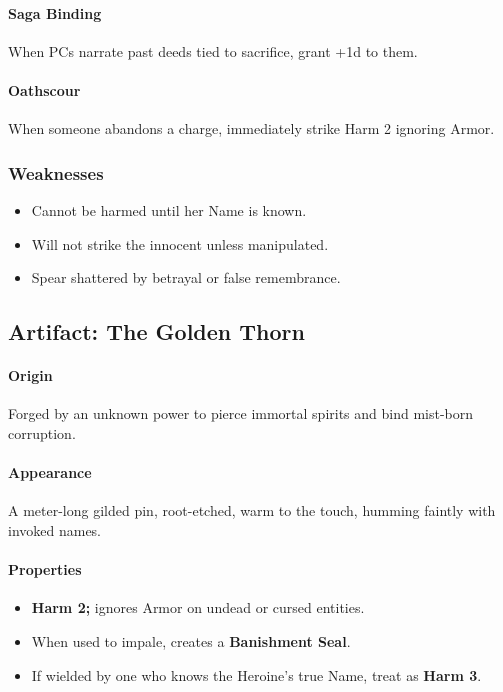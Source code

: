 \documentclass[11pt]{article}
\begin{document}
\paragraph*{Saga Binding}
When PCs narrate past deeds tied to sacrifice, grant +1d to them.

\paragraph*{Oathscour}
When someone abandons a charge, immediately strike Harm 2 ignoring Armor.

\subsubsection*{Weaknesses}
\begin{itemize}
    \item Cannot be harmed until her Name is known.
    \item Will not strike the innocent unless manipulated.
    \item Spear shattered by betrayal or false remembrance.
\end{itemize}


\subsection{Artifact: The Golden Thorn}
\label{artifact:golden_thorn}

\paragraph*{Origin}
Forged by an unknown power to pierce immortal spirits and bind mist-born corruption.

\paragraph*{Appearance}
A meter-long gilded pin, root-etched, warm to the touch, humming faintly with invoked names.

\paragraph*{Properties}
\begin{itemize}
    \item \textbf{Harm 2;} ignores Armor on undead or cursed entities.
    \item When used to impale, creates a \textbf{Banishment Seal}.
    \item If wielded by one who knows the Heroine's true Name, treat as \textbf{Harm 3}.
\end{itemize}
\end{document}
